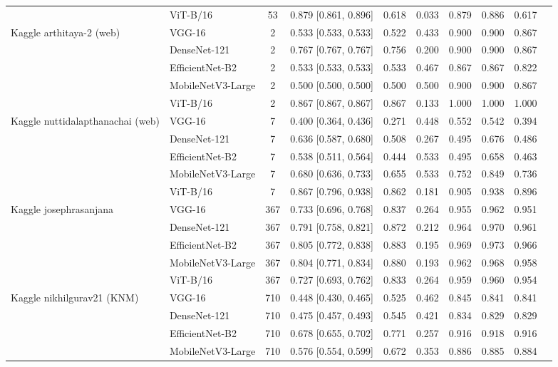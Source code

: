 \begin{table}[!tbp]
\begin{tabular}{llcclccccc}
 & ViT-B/16 & 53 & 0.879 [0.861, 0.896] & 0.618 & 0.033 & 0.879 & 0.886 & 0.617 \\
Kaggle arthitaya-2 (web) & VGG-16 & 2 & 0.533 [0.533, 0.533] & 0.522 & 0.433 & 0.900 & 0.900 & 0.867 \\
 & DenseNet-121 & 2 & 0.767 [0.767, 0.767] & 0.756 & 0.200 & 0.900 & 0.900 & 0.867 \\
 & EfficientNet-B2 & 2 & 0.533 [0.533, 0.533] & 0.533 & 0.467 & 0.867 & 0.867 & 0.822 \\
 & MobileNetV3-Large & 2 & 0.500 [0.500, 0.500] & 0.500 & 0.500 & 0.900 & 0.900 & 0.867 \\
 & ViT-B/16 & 2 & 0.867 [0.867, 0.867] & 0.867 & 0.133 & 1.000 & 1.000 & 1.000 \\
Kaggle nuttidalapthanachai (web) & VGG-16 & 7 & 0.400 [0.364, 0.436] & 0.271 & 0.448 & 0.552 & 0.542 & 0.394 \\
 & DenseNet-121 & 7 & 0.636 [0.587, 0.680] & 0.508 & 0.267 & 0.495 & 0.676 & 0.486 \\
 & EfficientNet-B2 & 7 & 0.538 [0.511, 0.564] & 0.444 & 0.533 & 0.495 & 0.658 & 0.463 \\
 & MobileNetV3-Large & 7 & 0.680 [0.636, 0.733] & 0.655 & 0.533 & 0.752 & 0.849 & 0.736 \\
 & ViT-B/16 & 7 & 0.867 [0.796, 0.938] & 0.862 & 0.181 & 0.905 & 0.938 & 0.896 \\
Kaggle josephrasanjana & VGG-16 & 367 & 0.733 [0.696, 0.768] & 0.837 & 0.264 & 0.955 & 0.962 & 0.951 \\
 & DenseNet-121 & 367 & 0.791 [0.758, 0.821] & 0.872 & 0.212 & 0.964 & 0.970 & 0.961 \\
 & EfficientNet-B2 & 367 & 0.805 [0.772, 0.838] & 0.883 & 0.195 & 0.969 & 0.973 & 0.966 \\
 & MobileNetV3-Large & 367 & 0.804 [0.771, 0.834] & 0.880 & 0.193 & 0.962 & 0.968 & 0.958 \\
 & ViT-B/16 & 367 & 0.727 [0.693, 0.762] & 0.833 & 0.264 & 0.959 & 0.960 & 0.954 \\
Kaggle nikhilgurav21 (KNM) & VGG-16 & 710 & 0.448 [0.430, 0.465] & 0.525 & 0.462 & 0.845 & 0.841 & 0.841 \\
 & DenseNet-121 & 710 & 0.475 [0.457, 0.493] & 0.545 & 0.421 & 0.834 & 0.829 & 0.829 \\
 & EfficientNet-B2 & 710 & 0.678 [0.655, 0.702] & 0.771 & 0.257 & 0.916 & 0.918 & 0.916 \\
 & MobileNetV3-Large & 710 & 0.576 [0.554, 0.599] & 0.672 & 0.353 & 0.886 & 0.885 & 0.884 \\

\end{tabular}
\end{table}
